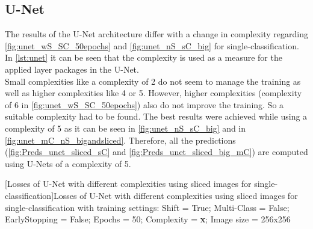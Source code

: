 \subsection{U-Net}
The results of the U-Net architecture differ with a change in complexity regarding \cref{fig:unet_wS_SC_50epochs} and \cref{fig:unet_nS_sC_big} for single-classification. In \cref{lst:unet} it can be seen that the complexity is used as a measure for the applied layer packages in the U-Net.\\
Small complexities like a complexity of 2 do not seem to manage the training as well as higher complexities like 4 or 5. However, higher complexities (complexity of 6 in \cref{fig:unet_wS_SC_50epochs}) also do not improve the training. So a suitable complexity had to be found. The best results were achieved while using a complexity of 5 as it can be seen in \cref{fig:unet_nS_sC_big} and in \cref{fig:unet_mC_nS_bigandsliced}. Therefore, all the predictions (\cref{fig:Preds_unet_sliced_sC} and \cref{fig:Preds_unet_sliced_big_mC}) are computed using U-Nets of a complexity of 5.\\
\begin{minipage}{\textwidth}
\centering
	
	[Losses of U-Net with different complexities using sliced images for single-classification]{Losses of U-Net with different complexities using sliced images for single-classification with training settings: Shift = True; Multi-Class = False; EarlyStopping = False; Epochs = 50; Complexity = \textbf{x}; Image size = 256x256}
	\label{fig:unet_wS_SC_50epochs}
	\vspace{5mm}
\end{minipage}

